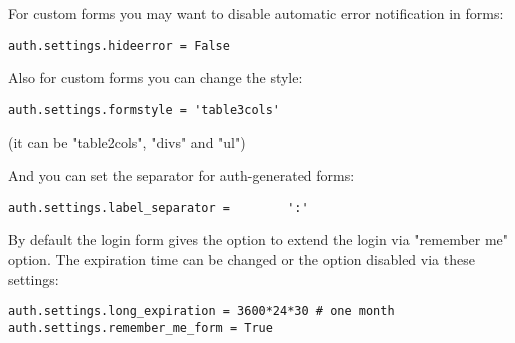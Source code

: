 \documentclass[justified,sixbynine,notoc]{tufte-book}
\begin{document}
\begin{fullwidth}
For custom forms you may want to disable automatic error notification in forms:

\begin{lstlisting}
auth.settings.hideerror = False
\end{lstlisting}

Also for custom forms you can change the style:

\begin{lstlisting}
auth.settings.formstyle = 'table3cols'
\end{lstlisting}

(it can be "table2cols", "divs" and "ul")

And you can set the separator for auth-generated forms:

\begin{lstlisting}
auth.settings.label_separator =        ':'
\end{lstlisting}

By default the login form gives the option to extend the login via "remember me" option. The expiration time can be changed or the option disabled via these settings:

\begin{lstlisting}
auth.settings.long_expiration = 3600*24*30 # one month
auth.settings.remember_me_form = True
\end{lstlisting}


\end{fullwidth}
\end{document}
